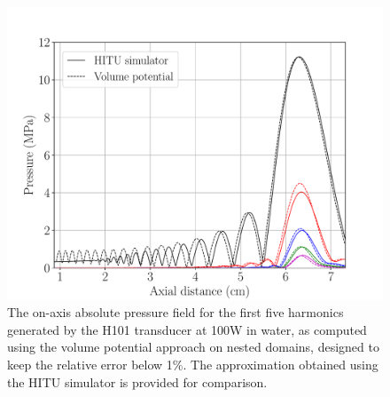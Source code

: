 \documentclass[preprint]{JASA}
\begin{document}
\begin{figure}[h!]
    \centering
    \includegraphics[width=\linewidth]{figures/H101_HITU_comparison_water_test_power100}
    \caption{The on-axis absolute pressure field for the first five harmonics generated 
    by the H101 transducer at 100W in water, as 
    computed using the volume potential approach on nested domains, designed to 
    keep the relative error below 1\%. The approximation obtained using the HITU
    simulator is provided for comparison.}
    \label{fig:HITU_comparison_H101_water}
\end{figure}  
\end{document}
